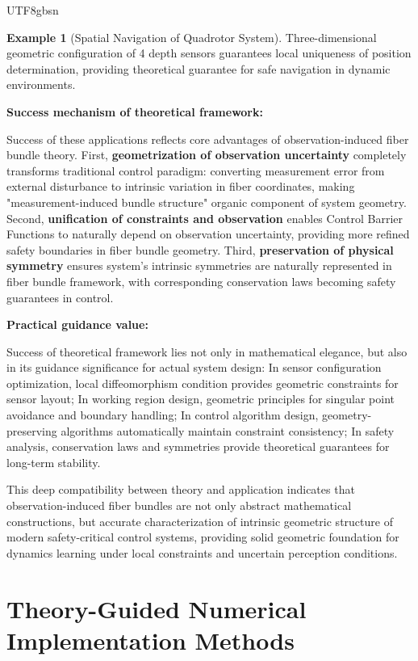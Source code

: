 \documentclass[a4paper,12pt]{extarticle}
\theoremstyle{definition}
\newtheorem{example}{Example}
\begin{document}
\begin{CJK}{UTF8}{gbsn}
\begin{example}[Spatial Navigation of Quadrotor System]
Three-dimensional geometric configuration of 4 depth sensors guarantees local uniqueness of position determination, providing theoretical guarantee for safe navigation in dynamic environments.
\end{example}

\textbf{Success mechanism of theoretical framework:}

Success of these applications reflects core advantages of observation-induced fiber bundle theory. First, \textbf{geometrization of observation uncertainty} completely transforms traditional control paradigm: converting measurement error from external disturbance to intrinsic variation in fiber coordinates, making "measurement-induced bundle structure" organic component of system geometry. Second, \textbf{unification of constraints and observation} enables Control Barrier Functions to naturally depend on observation uncertainty, providing more refined safety boundaries in fiber bundle geometry. Third, \textbf{preservation of physical symmetry} ensures system's intrinsic symmetries are naturally represented in fiber bundle framework, with corresponding conservation laws becoming safety guarantees in control.

\textbf{Practical guidance value:}

Success of theoretical framework lies not only in mathematical elegance, but also in its guidance significance for actual system design: In sensor configuration optimization, local diffeomorphism condition provides geometric constraints for sensor layout; In working region design, geometric principles for singular point avoidance and boundary handling; In control algorithm design, geometry-preserving algorithms automatically maintain constraint consistency; In safety analysis, conservation laws and symmetries provide theoretical guarantees for long-term stability.

This deep compatibility between theory and application indicates that observation-induced fiber bundles are not only abstract mathematical constructions, but accurate characterization of intrinsic geometric structure of modern safety-critical control systems, providing solid geometric foundation for dynamics learning under local constraints and uncertain perception conditions.


\section{Theory-Guided Numerical Implementation Methods}
\label{sec:numerical_methods}


\end{CJK}
\end{document}
